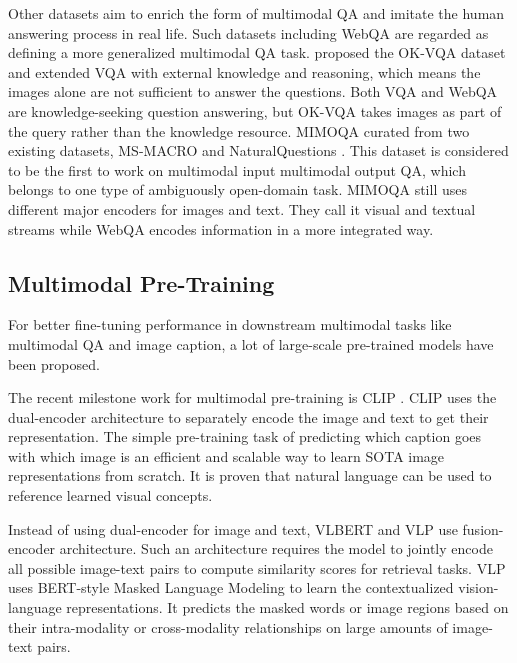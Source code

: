 \documentclass[nohyperref]{article}
\theoremstyle{plain}
\theoremstyle{definition}
\theoremstyle{remark}
\begin{document}
    Other datasets aim to enrich the form of multimodal QA and imitate the human answering process in real life. Such datasets including WebQA \citep{webqa} are regarded as defining a more generalized multimodal QA task. \citet{okvqa} proposed the OK-VQA dataset and extended VQA with external knowledge and reasoning, which means the images alone are not sufficient to answer the questions. Both VQA and WebQA are knowledge-seeking question answering, but OK-VQA takes images as part of the query rather than the knowledge resource. MIMOQA \citep{singh-etal-2021-mimoqa} curated from two existing datasets, MS-MACRO \citep{DBLP:journals/corr/NguyenRSGTMD16} and NaturalQuestions \citep{47761}. This dataset is considered to be the first to work on multimodal input multimodal output QA, which belongs to one type of ambiguously open-domain task. MIMOQA still uses different major encoders for images and text. They call it visual and textual streams while WebQA encodes information in a more integrated way.

    \subsection{Multimodal Pre-Training}
    For better fine-tuning performance in downstream multimodal tasks like multimodal QA and image caption, a lot of large-scale pre-trained models have been proposed.\par

    The recent milestone work for multimodal pre-training is CLIP \citep{clip}. CLIP uses the dual-encoder architecture to separately encode the image and text to get their representation. The simple pre-training task
    of predicting which caption goes with which image is an efficient and scalable way to learn SOTA
    image representations from scratch. It is proven that natural language
    can be used to reference learned visual concepts.\par

    Instead of using dual-encoder for image and text, VLBERT \citep{DBLP:journals/corr/abs-1908-08530} and VLP \citep{vlp} use fusion-encoder architecture. Such an architecture requires the model to jointly encode all possible image-text pairs to compute similarity scores for retrieval tasks. VLP uses BERT-style Masked Language Modeling to learn the contextualized vision-language representations. It predicts the masked words or image regions based on their intra-modality or cross-modality relationships on large amounts of image-text pairs.\par
\end{document}
